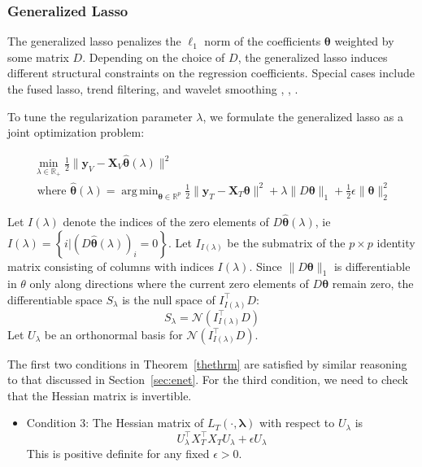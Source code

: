 \documentclass[10pt,letterpaper]{article}
\DeclareMathOperator*{\argmin}{arg\,min}
\begin{document}
\subsubsection{Generalized Lasso}
The generalized lasso \citep{roth2004generalized} penalizes the $\ell_1$ norm of the coefficients $\boldsymbol \theta$ weighted by some matrix $D$. Depending on the choice of $D$, the generalized lasso induces different structural constraints on the regression coefficients. Special cases include the fused lasso, trend filtering, and wavelet smoothing \citep{tibshirani2005sparsity}, \citep{kim2009ell_1}, \citep{donoho1994ideal}.

To tune the regularization parameter $\lambda$, we formulate the generalized lasso as a joint optimization problem:

\begin{equation}
\begin{array}{c}
\min_{\lambda \in \mathbb{R}_{+}} \frac{1}{2} \| \boldsymbol{y}_V - \boldsymbol{X}_V \hat{\boldsymbol{\theta}} (\lambda) \| ^2 \\
\text{ where }
\hat{\boldsymbol{\theta}} (\lambda) =
\argmin_{\boldsymbol{\theta} \in \mathbb{R}^p}
\frac{1}{2} \| \boldsymbol{y}_T - \boldsymbol{X}_T \boldsymbol{\theta} \| ^2
+ \lambda \| D \boldsymbol{\theta} \|_1
+ \frac{1}{2} \epsilon \| \boldsymbol{\theta} \|_2^2
\end{array}
\label{genlasso}
\end{equation}

Let $I(\lambda)$ denote the indices of the zero elements of $D \hat{\boldsymbol{\theta}}(\lambda)$, ie $I(\lambda) = \left \{i | (D \hat{\boldsymbol{\theta}}(\lambda))_i = 0 \right \}$.
Let $I_{I(\lambda)}$ be the submatrix of the $p \times p$ identity matrix consisting of columns with indices $I(\lambda)$. Since $\|D \boldsymbol{\theta}\|_1$ is differentiable in $\theta$ only along directions where the current zero elements of $D \boldsymbol{\theta}$ remain zero, the differentiable space $S_\lambda$ is the null space of $I_{I(\lambda)}^\top D$:
\begin{equation}
S_\lambda = \mathcal{N}(I_{I(\lambda)}^\top D)
\end{equation}
Let $U_\lambda$ be an orthonormal basis for $\mathcal{N}(I_{I(\lambda)}^\top D)$.

The first two conditions in Theorem~\ref{thethrm} are satisfied by similar reasoning to that discussed in Section~\ref{sec:enet}. For the third condition, we need to check that the Hessian matrix is invertible.
\begin{itemize}
\item[] Condition 3: The Hessian matrix of $L_T(\cdot, \boldsymbol{\lambda})$ with respect to $U_\lambda$ is
\begin{equation}
U_\lambda^\top X_T^\top X_T U_\lambda + \epsilon U_\lambda
\end{equation}
This is positive definite for any fixed $\epsilon > 0$.
\hfill {}
\end{itemize}
\end{document}
